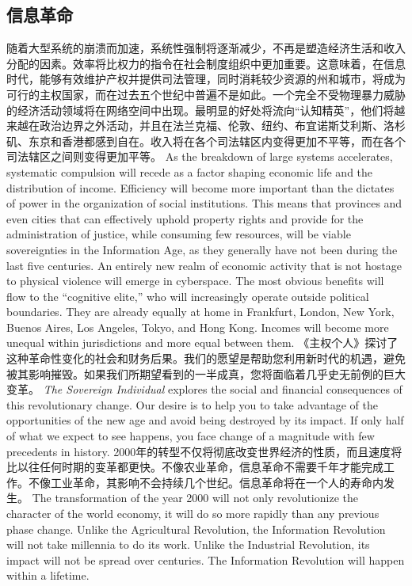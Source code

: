 \subsection{信息革命}
\begin{paracol}{2}[]
随着大型系统的崩溃而加速，系统性强制将逐渐减少，不再是塑造经济生活和收入分配的因素。效率将比权力的指令在社会制度组织中更加重要。这意味着，在信息时代，能够有效维护产权并提供司法管理，同时消耗较少资源的州和城市，将成为可行的主权国家，而在过去五个世纪中普遍不是如此。一个完全不受物理暴力威胁的经济活动领域将在网络空间中出现。最明显的好处将流向“认知精英”，他们将越来越在政治边界之外活动，并且在法兰克福、伦敦、纽约、布宜诺斯艾利斯、洛杉矶、东京和香港都感到自在。收入将在各个司法辖区内变得更加不平等，而在各个司法辖区之间则变得更加平等。
\switchcolumn
As the breakdown of large systems accelerates, systematic compulsion will recede as a factor shaping economic life and the distribution of income. Efficiency will become more important than the dictates of power in the organization of social institutions. This means that provinces and even cities that can effectively uphold property rights and provide for the administration of justice, while consuming few resources, will be viable sovereignties in the Information Age, as they generally have not been during the last five centuries. An entirely new realm of economic activity that is not hostage to physical violence will emerge in cyberspace. The most obvious benefits will flow to the ``cognitive elite,'' who will increasingly operate outside political boundaries. They are already equally at home in Frankfurt, London, New York, Buenos Aires, Los Angeles, Tokyo, and Hong Kong. Incomes will become more unequal within jurisdictions and more equal between them.
\switchcolumn*
《主权个人》探讨了这种革命性变化的社会和财务后果。我们的愿望是帮助您利用新时代的机遇，避免被其影响摧毁。如果我们所期望看到的一半成真，您将面临着几乎史无前例的巨大变革。
\switchcolumn
\emph{The Sovereign Individual} explores the social and financial consequences of this revolutionary change. Our desire is to help you to take advantage of the opportunities of the new age and avoid being destroyed by its impact. If only half of what we expect to see happens, you face change of a magnitude with few precedents in history.
\switchcolumn*
2000年的转型不仅将彻底改变世界经济的性质，而且速度将比以往任何时期的变革都更快。不像农业革命，信息革命不需要千年才能完成工作。不像工业革命，其影响不会持续几个世纪。信息革命将在一个人的寿命内发生。
\switchcolumn
The transformation of the year 2000 will not only revolutionize the character of the world economy, it will do so more rapidly than any previous phase change. Unlike the Agricultural Revolution, the Information Revolution will not take millennia to do its work. Unlike the Industrial Revolution, its impact will not be spread over centuries. The Information Revolution will happen within a lifetime. 

\end{paracol}
